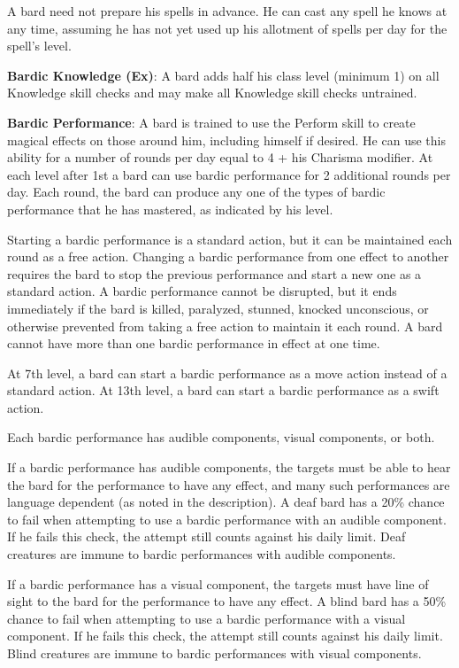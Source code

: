 A bard need not prepare his spells in advance. He can cast any spell he knows at any time, assuming he has not yet used up his allotment of spells per day for the spell's level. 
				
\textbf{Bardic Knowledge (Ex)}: A bard adds half his class level (minimum 1) on all Knowledge skill checks and may make all Knowledge skill checks untrained. 
				
\textbf{Bardic Performance}: A bard is trained to use the Perform skill to create magical effects on those around him, including himself if desired. He can use this ability for a number of rounds per day equal to 4 + his Charisma modifier. At each level after 1st a bard can use bardic performance for 2 additional rounds per day. Each round, the bard can produce any one of the types of bardic performance that he has mastered, as indicated by his level. 
				
Starting a bardic performance is a standard action, but it can be maintained each round as a free action. Changing a bardic performance from one effect to another requires the bard to stop the previous performance and start a new one as a standard action. A bardic performance cannot be disrupted, but it ends immediately if the bard is killed, paralyzed, stunned, knocked unconscious, or otherwise prevented from taking a free action to maintain it each round. A bard cannot have more than one bardic performance in effect at one time.
				
At 7th level, a bard can start a bardic performance as a move action instead of a standard action. At 13th level, a bard can start a bardic performance as a swift action. 
				
Each bardic performance has audible components, visual components, or both.
				
If a bardic performance has audible components, the targets must be able to hear the bard for the performance to have any effect, and many such performances are language dependent (as noted in the description). A deaf bard has a 20\% chance to fail when attempting to use a bardic performance with an audible component. If he fails this check, the attempt still counts against his daily limit. Deaf creatures are immune to bardic performances with audible components.
				
If a bardic performance has a visual component, the targets must have line of sight to the bard for the performance to have any effect. A blind bard has a 50\% chance to fail when attempting to use a bardic performance with a visual component. If he fails this check, the attempt still counts against his daily limit. Blind creatures are immune to bardic performances with visual components.
				
